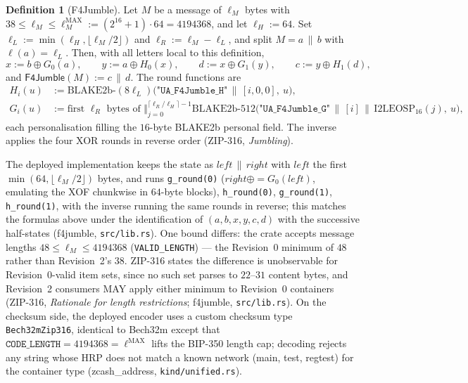 \documentclass[11pt,a4paper]{article}
\theoremstyle{definition}
\newtheorem{definition}[theorem]{Definition}
\begin{document}
\begin{definition}[F4Jumble]\label{def:f4jumble}
Let $M$ be a message of $\ell_M$ bytes with
$38 \le \ell_M \le \ell^{\mathrm{MAX}}_M := (2^{16}+1) \cdot 64 =
4194368$, and let $\ell_H := 64$. Set
$\ell_L := \min(\ell_H, \lfloor \ell_M/2 \rfloor)$ and
$\ell_R := \ell_M - \ell_L$, and split $M = a \,\|\, b$ with
$\ell(a) = \ell_L$. Then, with all letters local to this definition,
\[
x := b \oplus G_0(a), \qquad
y := a \oplus H_0(x), \qquad
d := x \oplus G_1(y), \qquad
c := y \oplus H_1(d),
\]
and $\mathsf{F4Jumble}(M) := c \,\|\, d$. The round functions are
\begin{align*}
H_i(u) &:= \mathrm{BLAKE2b}\text{-}(8\ell_L)\bigl(
\texttt{"UA\_F4Jumble\_H"} \,\|\, [i, 0, 0],\ u\bigr), \\
G_i(u) &:= \text{first } \ell_R \text{ bytes of }
\big\Vert_{j=0}^{\lceil \ell_R/\ell_H \rceil - 1}
\mathrm{BLAKE2b}\text{-}512\bigl(
\texttt{"UA\_F4Jumble\_G"} \,\|\, [i] \,\|\, \mathrm{I2LEOSP}_{16}(j),\
u\bigr),
\end{align*}
each personalisation filling the $16$-byte BLAKE2b personal field. The
inverse applies the four XOR rounds in reverse order (ZIP-316,
\emph{Jumbling}).
\end{definition}

The deployed implementation keeps the state as
$\mathit{left} \,\|\, \mathit{right}$ with $\mathit{left}$ the first
$\min(64, \lfloor \ell_M/2 \rfloor)$ bytes, and runs
\texttt{g\_round(0)} ($\mathit{right} \mathbin{\oplus{=}}
G_0(\mathit{left})$, emulating the XOF chunkwise in $64$-byte blocks),
\texttt{h\_round(0)}, \texttt{g\_round(1)}, \texttt{h\_round(1)}, with the
inverse running the same rounds in reverse; this matches the formulas
above under the identification of $(a, b, x, y, c, d)$ with the successive
half-states (\textsf{f4jumble}, \texttt{src/lib.rs}). One bound differs:
the crate accepts message lengths $48 \le \ell_M \le 4194368$
(\texttt{VALID\_LENGTH}) --- the Revision~0 minimum of $48$ rather than
Revision~2's $38$. ZIP-316 states the difference is unobservable for
Revision~0-valid item sets, since no such set parses to $22$--$31$ content
bytes, and Revision~2 consumers MAY apply either minimum to Revision~0
containers (ZIP-316, \emph{Rationale for length restrictions};
\textsf{f4jumble}, \texttt{src/lib.rs}). On the checksum side, the
deployed encoder uses a custom checksum type \texttt{Bech32mZip316},
identical to Bech32m except that $\texttt{CODE\_LENGTH} = 4194368 =
\ell^{\mathrm{MAX}}$ lifts the BIP-350 length cap; decoding rejects any
string whose HRP does not match a known network (main, test, regtest) for
the container type (\textsf{zcash\_address}, \texttt{kind/unified.rs}).
\end{document}
